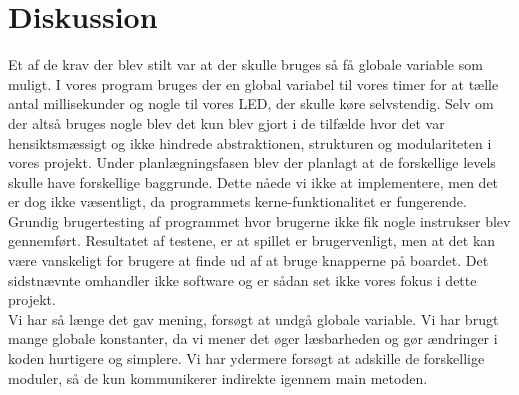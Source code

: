 \section{Diskussion}
Et af de krav der blev stilt var at der skulle bruges så få globale variable som muligt. I vores program bruges der en global variabel til vores timer for at tælle antal millisekunder og nogle til vores LED, der skulle køre selvstendig. Selv om der altså bruges nogle blev det kun blev gjort i de tilfælde hvor det var hensiktsmæssigt og ikke hindrede abstraktionen, strukturen og modulariteten i vores projekt.
Under planlægningsfasen blev der planlagt at de forskellige levels skulle have forskellige baggrunde. Dette nåede vi ikke at implementere, men det er dog ikke væsentligt, da programmets kerne-funktionalitet er fungerende.\\
Grundig brugertesting af programmet hvor brugerne ikke fik nogle instrukser blev gennemført. Resultatet af testene, er at spillet er brugervenligt, men at det kan være vanskeligt for brugere at finde ud af at bruge knapperne på boardet. Det sidstnævnte omhandler ikke software og er sådan set ikke vores fokus i dette projekt. \\ 
Vi har så længe det gav mening, forsøgt at undgå globale variable. Vi har brugt mange globale konstanter, da vi mener det øger læsbarheden og gør ændringer i koden hurtigere og simplere. Vi har ydermere forsøgt at adskille de forskellige moduler, så de kun kommunikerer indirekte igennem main metoden.